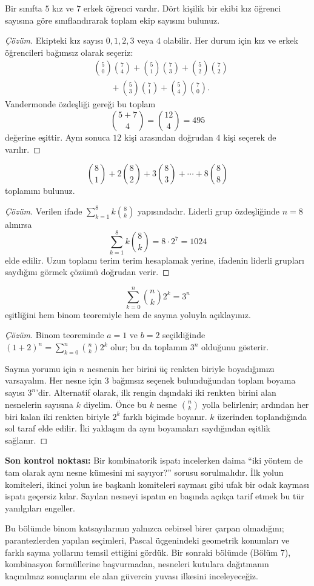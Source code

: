 \begin{example}
Bir sınıfta $5$ kız ve $7$ erkek öğrenci vardır. Dört kişilik bir ekibi kız öğrenci sayısına göre sınıflandırarak toplam ekip sayısını bulunuz.
\end{example}
\begin{proof}[Çözüm]
Ekipteki kız sayısı $0,1,2,3$ veya $4$ olabilir. Her durum için kız ve erkek öğrencileri bağımsız olarak seçeriz:
\begin{align*}
&\binom50\binom74+\binom51\binom73+\binom52\binom72\\
&\qquad+\binom53\binom71+\binom54\binom70.
\end{align*}
Vandermonde özdeşliği gereği bu toplam
\[
\binom{5+7}{4}=\binom{12}{4}=495
\]
değerine eşittir. Aynı sonuca $12$ kişi arasından doğrudan $4$ kişi seçerek de varılır.
\end{proof}

\begin{example}
\[
\binom81+2\binom82+3\binom83+\cdots+8\binom88
\]
toplamını bulunuz.
\end{example}
\begin{proof}[Çözüm]
Verilen ifade $\sum_{k=1}^{8}k\binom{8}{k}$ yapısındadır. Liderli grup özdeşliğinde $n=8$ alınırsa
\[
\sum_{k=1}^{8}k\binom{8}{k}=8\cdot2^7=1024
\]
elde edilir. Uzun toplamı terim terim hesaplamak yerine, ifadenin liderli grupları saydığını görmek çözümü doğrudan verir.
\end{proof}

\begin{example}
\[
\sum_{k=0}^{n}\binom{n}{k}2^k=3^n
\]
eşitliğini hem binom teoremiyle hem de sayma yoluyla açıklayınız.
\end{example}
\begin{proof}[Çözüm]
Binom teoreminde $a=1$ ve $b=2$ seçildiğinde $(1+2)^n=\sum_{k=0}^{n}\binom{n}{k}2^k$ olur; bu da toplamın $3^n$ olduğunu gösterir.

Sayma yorumu için $n$ nesnenin her birini üç renkten biriyle boyadığımızı varsayalım. Her nesne için $3$ bağımsız seçenek bulunduğundan toplam boyama sayısı $3^n$'dir. Alternatif olarak, ilk rengin dışındaki iki renkten birini alan nesnelerin sayısına $k$ diyelim. Önce bu $k$ nesne $\binom{n}{k}$ yolla belirlenir; ardından her biri kalan iki renkten biriyle $2^k$ farklı biçimde boyanır. $k$ üzerinden toplandığında sol taraf elde edilir. İki yaklaşım da aynı boyamaları saydığından eşitlik sağlanır.
\end{proof}

\textbf{Son kontrol noktası:} Bir kombinatorik ispatı incelerken daima ``iki yöntem de tam olarak aynı nesne kümesini mi sayıyor?'' sorusu sorulmalıdır. İlk yolun komiteleri, ikinci yolun ise başkanlı komiteleri sayması gibi ufak bir odak kayması ispatı geçersiz kılar. Sayılan nesneyi ispatın en başında açıkça tarif etmek bu tür yanılgıları engeller.

Bu bölümde binom katsayılarının yalnızca cebirsel birer çarpan olmadığını; parantezlerden yapılan seçimleri, Pascal üçgenindeki geometrik konumları ve farklı sayma yollarını temsil ettiğini gördük. Bir sonraki bölümde (Bölüm 7), kombinasyon formüllerine başvurmadan, nesneleri kutulara dağıtmanın kaçınılmaz sonuçlarını ele alan güvercin yuvası ilkesini inceleyeceğiz.
